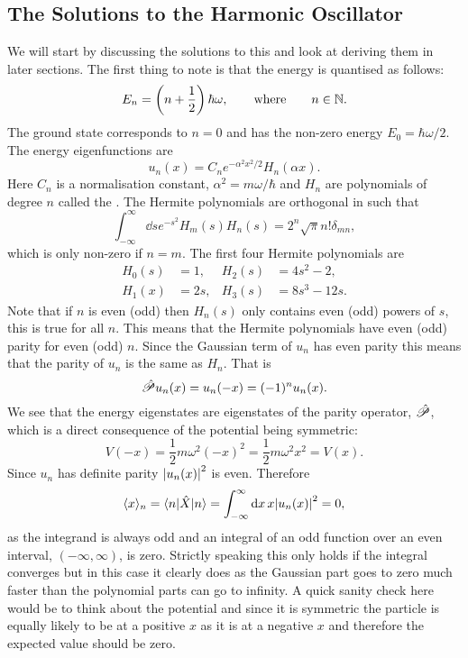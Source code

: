     \subsection{The Solutions to the Harmonic Oscillator}
    We will start by discussing the solutions to this and look at deriving them in later sections.
    The first thing to note is that the energy is quantised as follows:
    \[E_n = \left(n + \frac{1}{2}\right)\hbar\omega,\qquad\text{where}\qquad n\in\mathbb{N}.\]
    The ground state corresponds to \(n = 0\) and has the non-zero energy \(E_0 = \hbar\omega/2\).
    The energy eigenfunctions are
    \[u_n(x) = C_ne^{-\alpha^2x^2/2}H_n(\alpha x).\]
    Here \(C_n\) is a normalisation constant, \(\alpha^2 = m\omega/\hbar\) and \(H_n\) are polynomials of degree \(n\) called the .
    The Hermite polynomials are orthogonal in such that
    \[\int_{-\infty}^{\infty} \dd{s}e^{-s^2}H_m(s)H_n(s) = 2^n\sqrt{\pi}n!\delta_{mn},\]
    which is only non-zero if \(n = m\).
    The first four Hermite polynomials are
    \begin{align*}
        H_0(s) &= 1,  & H_2(s) &= 4s^2 - 2,\\
        H_1(x) &= 2s, & H_3(s) &= 8s^3 - 12s.
    \end{align*}
    Note that if \(n\) is even (odd) then \(H_n(s)\) only contains even (odd) powers of \(s\), this is true for all \(n\).
    This means that the Hermite polynomials have even (odd) parity for even (odd) \(n\).
    Since the Gaussian term of \(u_n\) has even parity this means that the parity of \(u_n\) is the same as \(H_n\).
    That is
    \[\hat{\mathscr{P}}u_n(x) = u_n(-x) = (-1)^nu_n(x).\]
    We see that the energy eigenstates are eigenstates of the parity operator, \(\hat{\mathscr{P}}\), which is a direct consequence of the potential being symmetric:
    \[V(-x) = \frac{1}{2}m\omega^2(-x)^2 = \frac{1}{2}m\omega^2x^2 = V(x).\]
    Since \(u_n\) has definite parity \(\abs{u_n(x)}^2\) is even.
    Therefore
    \[\langle{x}\rangle_n = \langle {n} \vert\hat{X}\vert {n} \rangle = \int_{-\infty}^{\infty} \dd{x} x\abs{u_n(x)}^2 = 0,\]
    as the integrand is always odd and an integral of an odd function over an even interval, \((-\infty, \infty)\), is zero.
    Strictly speaking this only holds if the integral converges but in this case it clearly does as the Gaussian part goes to zero much faster than the polynomial parts can go to infinity.
    A quick sanity check here would be to think about the potential and since it is symmetric the particle is equally likely to be at a positive \(x\) as it is at a negative \(x\) and therefore the expected value should be zero.
    
